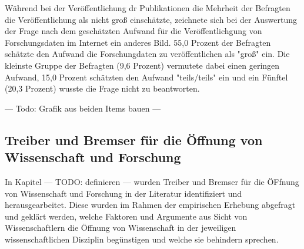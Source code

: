 Während bei der Veröffentlichung dr Publikationen die Mehrheit der Befragten die Veröffentlichung als nicht groß einschätzte, zeichnete sich bei der Auswertung der Frage nach dem geschätzten Aufwand für die Veröffentlichgung von Forschungsdaten im Internet ein anderes Bild. 55,0 Prozent der Befragten schätzte den Aufwand die Forschungdaten zu veröffentlichen als "groß" ein. Die kleinste Gruppe der Befragten (9,6 Prozent) vermutete dabei einen geringen Aufwand, 15,0 Prozent schätzten den Aufwand "teils/teils" ein und ein Fünftel (20,3 Prozent) wusste die Frage nicht zu beantworten.

--- Todo: Grafik aus beiden Items bauen ---

\subsection{Treiber und Bremser für die Öffnung von Wissenschaft und Forschung}

In Kapitel --- TODO: definieren --- wurden Treiber und Bremser für die ÖFfnung von Wissenschaft und Forschung in der Literatur identifiziert und herausgearbeitet. Diese wurden im Rahmen der empirischen Erhebung abgefragt und geklärt werden, welche Faktoren und Argumente aus Sicht von Wissenschaftlern die Öffnung von Wissenschaft in der jeweiligen wissenschaftlichen Disziplin begünstigen und welche sie behindern sprechen.

